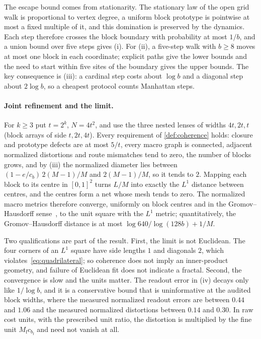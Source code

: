 The escape bound comes from stationarity.
The stationary law of the open grid walk is proportional to vertex degree, a uniform block prototype is pointwise at most a fixed multiple of it, and this domination is preserved by the dynamics.
Each step therefore crosses the block boundary with probability at most $1/b$, and a union bound over five steps gives (i).
For (ii), a five-step walk with $b\ge8$ moves at most one block in each coordinate; explicit paths give the lower bounds and the need to start within five sites of the boundary gives the upper bounds.
The key consequence is (iii): a cardinal step costs about $\log b$ and a diagonal step about $2\log b$, so a cheapest protocol counts Manhattan steps.

\paragraph{Joint refinement and the limit.}
For $k\ge3$ put $t=2^k$, $N=4t^2$, and use the three nested lenses of widths $4t,2t,t$ (block arrays of side $t,2t,4t$).
Every requirement of \cref{def:coherence} holds: closure and prototype defects are at most $5/t$, every macro graph is connected, adjacent normalized distortions and route mismatches tend to zero, the number of blocks grows, and by (iii) the normalized diameter lies between $(1-e/c_b)\,2(M-1)/M$ and $2(M-1)/M$, so it tends to $2$.
Mapping each block to its centre in $[0,1]^2$ turns $L/M$ into exactly the $L^1$ distance between centres, and the centres form a net whose mesh tends to zero.
The normalized macro metrics therefore converge, uniformly on block centres and in the Gromov--Hausdorff sense~\cite{Gromov1999Metric}, to the unit square with the $L^1$ metric; quantitatively, the Gromov--Hausdorff distance is at most $\log640/\log(128b)+1/M$.

Two qualifications are part of the result.
First, the limit is not Euclidean.
The four corners of an $L^1$ square have side lengths $1$ and diagonals $2$, which violates~\eqref{eq:quadrilateral}; so coherence does not imply an inner-product geometry, and failure of Euclidean fit does not indicate a fractal.
Second, the convergence is slow and the units matter.
The readout error in (iv) decays only like $1/\log b$, and it is a conservative bound that is uninformative at the audited block widths, where the measured normalized readout errors are between $0.44$ and $1.06$ and the measured normalized distortions between $0.14$ and $0.30$.
In raw cost units, with the prescribed unit ratio, the distortion is multiplied by the fine unit $M_{\mathrm f}c_{b_{\mathrm f}}$ and need not vanish at all.

